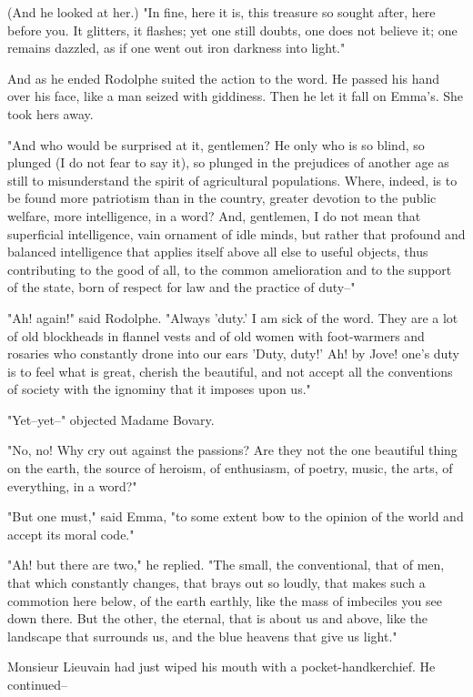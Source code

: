 \documentclass[11pt,twocolumn]{ltugboat}
\begin{document}
(And he looked at her.) "In fine, here it is, this treasure so sought
after, here before you. It glitters, it flashes; yet one still doubts,
one does not believe it; one remains dazzled, as if one went out iron
darkness into light."

And as he ended Rodolphe suited the action to the word. He passed his
hand over his face, like a man seized with giddiness. Then he let it
fall on Emma's. She took hers away.

"And who would be surprised at it, gentlemen? He only who is so blind,
so plunged (I do not fear to say it), so plunged in the prejudices
of another age as still to misunderstand the spirit of agricultural
populations. Where, indeed, is to be found more patriotism than in the
country, greater devotion to the public welfare, more intelligence, in a
word? And, gentlemen, I do not mean that superficial intelligence,
vain ornament of idle minds, but rather that profound and balanced
intelligence that applies itself above all else to useful objects, thus
contributing to the good of all, to the common amelioration and to
the support of the state, born of respect for law and the practice of
duty--"

"Ah! again!" said Rodolphe. "Always 'duty.' I am sick of the word.
They are a lot of old blockheads in flannel vests and of old women with
foot-warmers and rosaries who constantly drone into our ears 'Duty,
duty!' Ah! by Jove! one's duty is to feel what is great, cherish the
beautiful, and not accept all the conventions of society with the
ignominy that it imposes upon us."

"Yet--yet--" objected Madame Bovary.

"No, no! Why cry out against the passions? Are they not the one
beautiful thing on the earth, the source of heroism, of enthusiasm, of
poetry, music, the arts, of everything, in a word?"

"But one must," said Emma, "to some extent bow to the opinion of the
world and accept its moral code."

"Ah! but there are two," he replied. "The small, the conventional, that
of men, that which constantly changes, that brays out so loudly, that
makes such a commotion here below, of the earth earthly, like the mass
of imbeciles you see down there. But the other, the eternal, that is
about us and above, like the landscape that surrounds us, and the blue
heavens that give us light."

Monsieur Lieuvain had just wiped his mouth with a pocket-handkerchief.
He continued--
\end{document}
